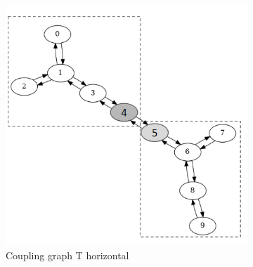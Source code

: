 \begin{figure}[!htb]
\begin{subfigure}{0.4\linewidth}
        \includegraphics[width=\linewidth]{image/coupling_graph_t_horizontal.png}
        \caption{Coupling graph T horizontal}
        \label{fig:coupling-graph-t-horizontal}
    \end{subfigure}
    \hfill
    \begin{subfigure}{0.3\linewidth}

\end{subfigure}
\end{figure}

